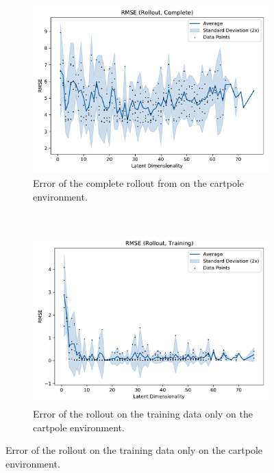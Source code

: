 			\begin{figure}
				\centering
				\begin{subfigure}{0.7\linewidth}
					\centering
					\includegraphics[width=\linewidth]{figures/results/cartpole-gym/latent-dim/comparison-rmse-rollout-mean-vs-latent-dim.pdf}
					\caption{Error of the complete rollout from on the cartpole environment.}
					\label{fig:cartpoleRmseComplete}
				\end{subfigure} \\
				\begin{subfigure}{0.5\linewidth}
					\centering
					\includegraphics[width=\linewidth]{figures/results/cartpole-gym/latent-dim/comparison-rmse-rollout-train-mean-vs-latent-dim.pdf}
					\caption{Error of the rollout on the training data only on the cartpole environment.}

\end{subfigure}
\end{figure}
